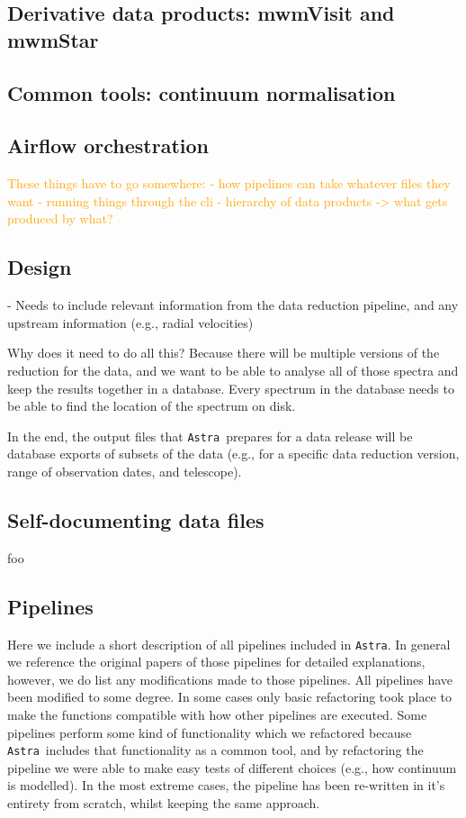 \documentclass[modern]{aastex631}
\newcommand{\astra}{\texttt{Astra}}
\newcommand{\todo}[1]{\textcolor{orange}{#1}}
\begin{document}
\subsection{Derivative data products: mwmVisit and mwmStar}

\subsection{Common tools: continuum normalisation}
\subsection{Airflow orchestration}


\todo{
These things have to go somewhere:
- how pipelines can take whatever files they want
- running things through the cli
- hierarchy of data products -> what gets produced by what?
}


\subsection{Design}

- Needs to include relevant information from the data reduction pipeline, and any upstream information (e.g., radial velocities)

Why does it need to do all this? 
Because there will be multiple versions of the reduction for the data, and we want to be able to analyse all of those spectra and keep the results together in a database. Every spectrum in the database needs to be able to find the location of the spectrum on disk.

In the end, the output files that \astra\ prepares for a data release will be database exports of subsets of the data (e.g., for a specific data reduction version, range of observation dates, and telescope). 

\subsection{Self-documenting data files}
foo

\subsection{Pipelines}
Here we include a short description of all pipelines included in \astra. 
In general we reference the original papers of those pipelines for detailed explanations, however, we do list any modifications made to those pipelines.
All pipelines have been modified to some degree. In some cases only basic refactoring took place to make the functions compatible with how other pipelines are executed. Some pipelines perform some kind of functionality which we refactored because \astra\ includes that functionality as a common tool, and by refactoring the pipeline we were able to make easy tests of different choices (e.g., how continuum is modelled). In the most extreme cases, the pipeline has been re-written in it's entirety from scratch, whilst keeping the same approach.
\end{document}
